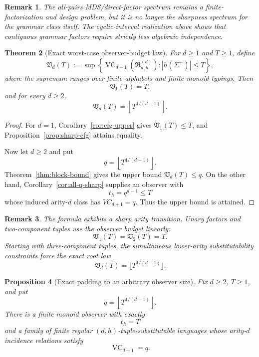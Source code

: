 \documentclass[11pt]{article}
\newtheorem{theorem}{Theorem}[section]
\newtheorem{proposition}[theorem]{Proposition}
\newtheorem{remark}[theorem]{Remark}
\newcommand{\Rclass}{\mathfrak R}
\newcommand{\VC}{\operatorname{VC}}
\begin{document}
\begin{remark}
The all-pairs MDS/direct-factor spectrum remains a finite-factorization and
design problem, but it is no longer the sharpness spectrum for the grammar
class itself.  The cyclic-interval realization above shows that contiguous
grammar factors require strictly less algebraic independence.
\end{remark}

\begin{theorem}[Exact worst-case observer-budget law]
\label{thm:observer-budget-law}
For \(d\ge1\) and \(T\ge1\), define
\[
 \mathfrak V_d(T):=
 \sup\left\{
 \VC_{d+1}\!\left(\Rclass_{d,h}^{(d)}\right):
 |h(\Sigma^+)|\le T
 \right\},
\]
where the supremum ranges over finite alphabets and finite-monoid typings.
Then
\[
 \boxed{\mathfrak V_1(T)=T},
\]
and for every \(d\ge2\),
\[
 \boxed{
 \mathfrak V_d(T)
 =\left\lfloor T^{1/(d-1)}\right\rfloor.
 }
\]
\end{theorem}

\begin{proof}
For \(d=1\), Corollary~\ref{cor:cfg-upper} gives
\(\mathfrak V_1(T)\le T\), and
Proposition~\ref{prop:sharp-cfg} attains equality.

Now let \(d\ge2\) and put
\[
 q=\left\lfloor T^{1/(d-1)}\right\rfloor.
\]
Theorem~\ref{thm:block-bound} gives the upper bound
\(\mathfrak V_d(T)\le q\). On the other hand,
Corollary~\ref{cor:all-q-sharp} supplies an observer with
\[
 t_h=q^{d-1}\le T
\]
whose induced arity-\(d\) class has \(VC_{d+1}=q\).
Thus the upper bound is attained.
\end{proof}

\begin{remark}
The formula exhibits a sharp arity transition. Unary factors and
two-component tuples use the observer budget linearly:
\[
 \mathfrak V_1(T)=\mathfrak V_2(T)=T.
\]
Starting with three-component tuples, the simultaneous lower-arity
substitutability constraints force the exact root law
\[
 \mathfrak V_d(T)=\lfloor T^{1/(d-1)}\rfloor.
\]
\end{remark}

\begin{proposition}[Exact padding to an arbitrary observer size]
\label{prop:arbitrary-budget}
Fix \(d\ge2\), \(T\ge1\), and put
\[
 q=\left\lfloor T^{1/(d-1)}\right\rfloor.
\]
There is a finite monoid observer with exactly
\[
 t_h=T
\]
and a family of finite regular \((d,h)\)-tuple-substitutable languages
whose arity-\(d\) incidence relations satisfy
\[
 \VC_{d+1}=q.
\]
\end{proposition}
\end{document}
